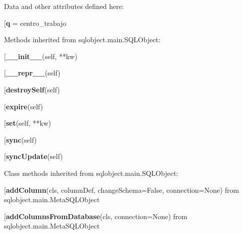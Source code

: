 Data and other attributes defined here:\\
\begin{description}\item[{\bf q} = centro\_trabajo\end{description}


Methods inherited from sqlobject.main.SQLObject:\\
\begin{description}\item[{\bf \_\_init\_\_}(self, **kw)\end{description}

\begin{description}\item[{\bf \_\_repr\_\_}(self)\end{description}

\begin{description}\item[{\bf destroySelf}(self)\end{description}

\begin{description}\item[{\bf expire}(self)\end{description}

\begin{description}\item[{\bf set}(self, **kw)\end{description}

\begin{description}\item[{\bf sync}(self)\end{description}

\begin{description}\item[{\bf syncUpdate}(self)\end{description}


Class methods inherited from sqlobject.main.SQLObject:\\
\begin{description}\item[{\bf addColumn}(cls, columnDef, changeSchema=False, connection=None) from sqlobject.main.MetaSQLObject\end{description}

\begin{description}\item[{\bf addColumnsFromDatabase}(cls, connection=None) from sqlobject.main.MetaSQLObject\end{description}

